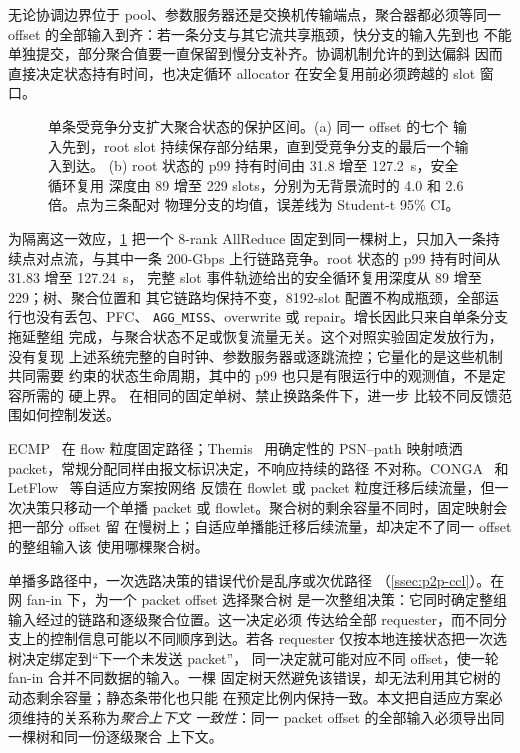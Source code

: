 无论协调边界位于 pool、参数服务器还是交换机传输端点，聚合器都必须等同一
offset 的全部输入到齐：若一条分支与其它流共享瓶颈，快分支的输入先到也
不能单独提交，部分聚合值要一直保留到慢分支补齐。协调机制允许的到达偏斜
因而直接决定状态持有时间，也决定循环 allocator 在安全复用前必须跨越的
slot 窗口。

\begin{figure}[t]
\centering

\caption{单条受竞争分支扩大聚合状态的保护区间。(a) 同一 offset 的七个
输入先到，root slot 持续保存部分结果，直到受竞争分支的最后一个输入到达。
(b) root 状态的 p99 持有时间由 31.8 增至 127.2~\textmu s，安全循环复用
深度由 89 增至 229 slots，分别为无背景流时的 4.0 和 2.6 倍。点为三条配对
物理分支的均值，误差线为 Student-t 95\% CI。}
\label{fig:motivation-branch-skew}
\end{figure}

为隔离这一效应，\cref{fig:motivation-branch-skew} 把一个 8-rank
AllReduce 固定到同一棵树上，只加入一条持续点对点流，与其中一条 200-Gbps
上行链路竞争。root 状态的 p99 持有时间从 31.83 增至 127.24~\textmu s，
完整 slot 事件轨迹给出的安全循环复用深度从 89 增至 229；树、聚合位置和
其它链路均保持不变，8192-slot 配置不构成瓶颈，全部运行也没有丢包、PFC、
\texttt{AGG\_MISS}、overwrite 或 repair。增长因此只来自单条分支拖延整组
完成，与聚合状态不足或恢复流量无关。这个对照实验固定发放行为，没有复现
上述系统完整的自时钟、参数服务器或逐跳流控；它量化的是这些机制共同需要
约束的状态生命周期，其中的 p99 也只是有限运行中的观测值，不是定容所需的
硬上界。 在相同的固定单树、禁止换路条件下，进一步
比较不同反馈范围如何控制发送。

ECMP~\cite{ecmp} 在 flow 粒度固定路径；Themis~\cite{themis} 用确定性的
PSN--path 映射喷洒 packet，常规分配同样由报文标识决定，不响应持续的路径
不对称。CONGA~\cite{conga} 和 LetFlow~\cite{letflow} 等自适应方案按网络
反馈在 flowlet 或 packet 粒度迁移后续流量，但一次决策只移动一个单播
packet 或 flowlet。聚合树的剩余容量不同时，固定映射会把一部分 offset 留
在慢树上；自适应单播能迁移后续流量，却决定不了同一 offset 的整组输入该
使用哪棵聚合树。

单播多路径中，一次选路决策的错误代价是乱序或次优路径
（\cref{ssec:p2p-ccl}）。在网 fan-in 下，为一个 packet offset 选择聚合树
是一次整组决策：它同时确定整组输入经过的链路和逐级聚合位置。这一决定必须
传达给全部 requester，而不同分支上的控制信息可能以不同顺序到达。若各
requester 仅按本地连接状态把一次选树决定绑定到``下一个未发送 packet''，
同一决定就可能对应不同 offset，使一轮 fan-in 合并不同数据的输入。一棵
固定树天然避免该错误，却无法利用其它树的动态剩余容量；静态条带化也只能
在预定比例内保持一致。本文把自适应方案必须维持的关系称为\emph{聚合上下文
一致性}：同一 packet offset 的全部输入必须导出同一棵树和同一份逐级聚合
上下文。

